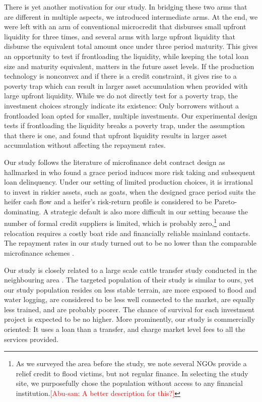 	There is yet another motivation for our study. In bridging these two arms that are different in multiple aspects, we introduced intermediate arms. At the end, we were left with an arm of conventional microcredit that disburses small upfront liquidity for three times, and several arms with large upfront liquidity that disburse the equivalent total amount once under three period maturity. This gives an opportunity to test if frontloading the liquidity, while keeping the total loan size and maturity equivalent, matters in the future asset levels. If the production technology is nonconvex and if there is a credit constraint, it gives rise to a poverty trap which can result in larger asset accumulation when provided with large upfront liquidity. While we do not directly test for a poverty trap, the investment choices strongly indicate its existence: Only borrowers without a frontloaded loan opted for smaller, multiple investments. Our experimental design tests if frontloading the liquidity breaks a poverty trap, under the assumption that there is one, and found that upfront liquidity results in larger asset accumulation without affecting the repayment rates.

	Our study follows the literature of microfinance debt contract design as hallmarked in \citet{Field2013} who found a grace period induces more risk taking and subsequent loan delinquency. Under our setting of limited production choices, it is irrational to invest in riskier assets, such as goats, when the designed grace period suits the heifer cash flow and a heifer's risk-return profile is considered to be Pareto-dominating. A strategic default is also more difficult in our setting because the number of formal credit suppliers is limited, which is probably zero,\footnote{As we surveyed the area before the study, we note several NGOs provide a relief credit to flood victims, but not regular finance. In selecting the study site, we purposefully chose the population without access to any financial institution.\textcolor{red}{[Abu-san: A better description for this?]} } and relocation requires a costly boat ride and financially reliable mainland contacts. The repayment rates in our study turned out to be no lower than the comparable microfinance schemes \citep{BanerjeeKarlanZinman2015}.

	Our study is closely related to a large scale cattle transfer study conducted in the neighbouring area \citep{BandieraBRAC2017, Balboni2020}. The targeted population of their study is similar to ours, yet our study population resides on less stable terrain, are more exposed to flood and water logging, are considered to be less well connected to the market, are equally less trained, and are probably poorer. The chance of survival for each investment project is expected to be no higher. More prominently, our study is commercially oriented: It uses a loan than a transfer, and charge market level fees to all the services provided. 
	
